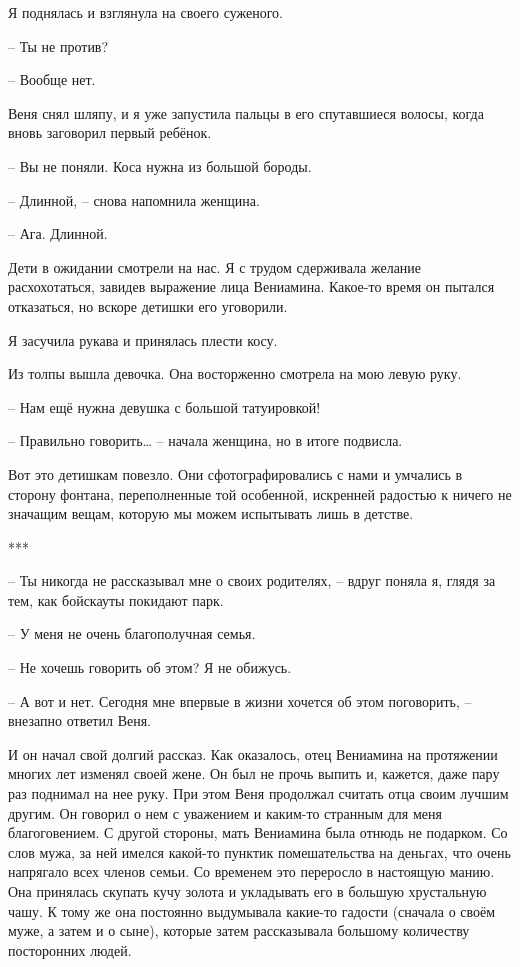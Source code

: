 \documentclass[
]{book}
\begin{document}
Я поднялась и взглянула на своего суженого.

-- Ты не против?

-- Вообще нет.

Веня снял шляпу, и я уже запустила пальцы в его спутавшиеся волосы, когда вновь заговорил первый ребёнок.

-- Вы не поняли. Коса нужна из большой бороды.

-- Длинной, -- снова напомнила женщина.

-- Ага. Длинной.

Дети в ожидании смотрели на нас. Я с трудом сдерживала желание расхохотаться, завидев выражение лица Вениамина. Какое-то время он пытался отказаться, но вскоре детишки его уговорили.

Я засучила рукава и принялась плести косу.

Из толпы вышла девочка. Она восторженно смотрела на мою левую руку.

-- Нам ещё нужна девушка с большой татуировкой!

-- Правильно говорить\ldots{} -- начала женщина, но в итоге подвисла.

Вот это детишкам повезло. Они сфотографировались с нами и умчались в сторону фонтана, переполненные той особенной, искренней радостью к ничего не значащим вещам, которую мы можем испытывать лишь в детстве.

***

-- Ты никогда не рассказывал мне о своих родителях, -- вдруг поняла я, глядя за тем, как бойскауты покидают парк.

-- У меня не очень благополучная семья.

-- Не хочешь говорить об этом? Я не обижусь.

-- А вот и нет. Сегодня мне впервые в жизни хочется об этом поговорить, -- внезапно ответил Веня.

И он начал свой долгий рассказ. Как оказалось, отец Вениамина на протяжении многих лет изменял своей жене. Он был не прочь выпить и, кажется, даже пару раз поднимал на нее руку. При этом Веня продолжал считать отца своим лучшим другим. Он говорил о нем с уважением и каким-то странным для меня благоговением. С другой стороны, мать Вениамина была отнюдь не подарком. Со слов мужа, за ней имелся какой-то пунктик помешательства на деньгах, что очень напрягало всех членов семьи. Со временем это переросло в настоящую манию. Она принялась скупать кучу золота и укладывать его в большую хрустальную чашу. К тому же она постоянно выдумывала какие-то гадости (сначала о своём муже, а затем и о сыне), которые затем рассказывала большому количеству посторонних людей.
\end{document}
